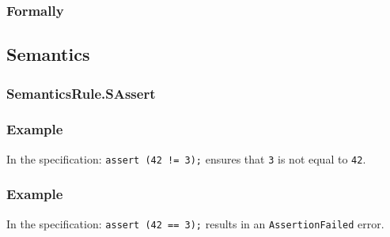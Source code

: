 \subsubsection{Formally}
\begin{mathpar}
\end{mathpar}

\subsection{Semantics}
\subsubsection{SemanticsRule.SAssert \label{sec:SemanticsRule.SAssert}}
\subsubsection{Example}
In the specification:
\texttt{assert (42 != 3);} ensures that \texttt{3} is not equal to \texttt{42}.

\subsubsection{Example}
In the specification:
\texttt{assert (42 == 3);} results in an \texttt{AssertionFailed} error.
